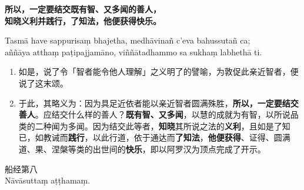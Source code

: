 \textbf{所以，一定要结交既有智、又多闻的善人，\\}
\textbf{知晓义利并践行，了知法，他便获得快乐。}

Tasmā have sappurisaṃ bhajetha, medhāvinañ c’eva bahussutañ ca;\\
aññāya atthaṃ paṭipajjamāno, viññātadhammo sa sukhaṃ labhethā ti. %

\begin{enumerate}\item 如是，说了令「智者能令他人理解」之义明了的譬喻，为敦促此亲近智者，便说了这末颂。
\item 于此，其略义为：因为具足近依者能以亲近智者圆满殊胜，\textbf{所以，一定要结交善人}。应结交什么样的善人？\textbf{既有智、又多闻}，以慧的成就为有智，以所说品类的二种闻为多闻。因为结交此等者，\textbf{知晓}其所说之法的\textbf{义利}，且如是了知已，如教诫而\textbf{践行}，以此行道，依于通达而\textbf{了知法}，\textbf{他便获得}、证得、圆满道、果、涅槃等类的出世间的\textbf{快乐}，即以阿罗汉为顶点完成了开示。\end{enumerate}

\begin{center}\vspace{1em}船经第八\\Nāvāsuttaṃ aṭṭhamaṃ.\end{center}